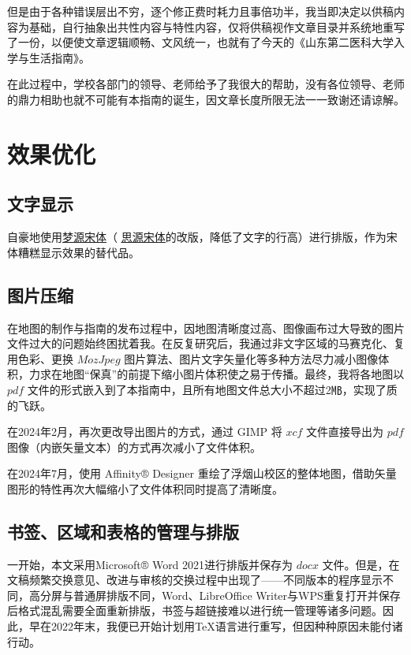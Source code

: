 但是由于各种错误层出不穷，逐个修正费时耗力且事倍功半，我当即决定以供稿内容为基础，自行抽象出共性内容与特性内容，仅将供稿视作文章目录并系统地重写了一份，以便使文章逻辑顺畅、文风统一，也就有了今天的《山东第二医科大学入学与生活指南》。

在此过程中，学校各部门的领导、老师给予了我很大的帮助，没有各位领导、老师的鼎力相助也就不可能有本指南的诞生，因文章长度所限无法一一致谢还请谅解。

\section[效果优化]{效果优化}
\subsection[文字显示]{文字显示}
自豪地使用\uline{\href{https://www.maoken.com/freefonts/15311.html}{梦源宋体}}（
\uline{\href{https://github.com/adobe-fonts/source-han-serif}{思源宋体}}的改版，降低了文字的行高）进行排版，作为宋体糟糕显示效果的替代品。

\subsection[图片压缩]{图片压缩}
在地图的制作与指南的发布过程中，因地图清晰度过高、图像画布过大导致的图片文件过大\footnotemark 的问题始终困扰着我。在反复研究后，我通过非文字区域的马赛克化、复用色彩、更换 $MozJpeg$ 图片算法、图片文字矢量化等多种方法尽力减小图像体积，力求在地图“保真”的前提下缩小图片体积使之易于传播。最终，我将各地图以 $pdf$ 文件的形式嵌入到了本指南中，且所有地图文件总大小不超过2㎆，实现了质的飞跃。

在2024年2月，再次更改导出图片的方式，通过 GIMP 将 $xcf$ 文件直接导出为 $pdf$ 图像（内嵌矢量文本）的方式再次减小了文件体积。

在2024年7月，使用 Affinity® Designer 重绘了浮烟山校区的整体地图，借助矢量图形的特性再次大幅缩小了文件体积同时提高了清晰度。

\subsection[书签、区域和表格的管理与排版]{书签、区域和表格的管理与排版}
一开始，本文采用Microsoft® Word 2021进行排版并保存为 $docx$ 文件。但是，在文稿频繁交换意见、改进与审核的交换过程中出现了——不同版本的程序显示不同，高分屏与普通屏排版不同，Word、LibreOffice Writer与WPS重复打开并保存后格式混乱需要全面重新排版，书签与超链接难以进行统一管理等诸多问题。因此，早在2022年末，我便已开始计划用\TeX 语言进行重写，但因种种原因未能付诸行动。

